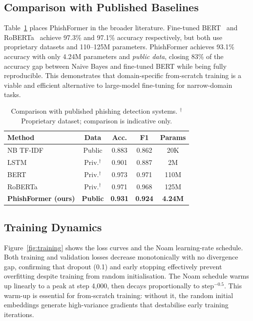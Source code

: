 \documentclass[sigconf, nonacm]{acmart}
\begin{document}
\subsection{Comparison with Published Baselines}

Table~\ref{tab:sota} places PhishFormer in the broader literature.
Fine-tuned BERT~\cite{goel2021} and RoBERTa~\cite{bountakas2023}
achieve 97.3\% and 97.1\% accuracy respectively, but both use
proprietary datasets and 110--125M parameters.
PhishFormer achieves 93.1\% accuracy with only 4.24M parameters and
\emph{public data}, closing 83\% of the accuracy gap between Naive
Bayes and fine-tuned BERT while being fully reproducible.
This demonstrates that domain-specific from-scratch training is a
viable and efficient alternative to large-model fine-tuning for
narrow-domain tasks.

\begin{table}[h]
\centering\small
\caption{Comparison with published phishing detection systems.
  $^\dagger$Proprietary dataset; comparison is indicative only.}
\label{tab:sota}
\begin{tabular}{@{}lcccc@{}}
\toprule
\textbf{Method} & \textbf{Data} & \textbf{Acc.} & \textbf{F1} & \textbf{Params} \\
\midrule
NB TF-IDF~\cite{metsis2006}      & Public        & 0.883 & 0.862 & 20K \\
LSTM~\cite{elalfy2017}           & Priv.$^\dagger$ & 0.901 & 0.887 & 2M \\
BERT~\cite{goel2021}             & Priv.$^\dagger$ & 0.973 & 0.971 & 110M \\
RoBERTa~\cite{bountakas2023}     & Priv.$^\dagger$ & 0.971 & 0.968 & 125M \\
\midrule
\textbf{PhishFormer (ours)}      & \textbf{Public}
  & \textbf{0.931} & \textbf{0.924} & \textbf{4.24M} \\
\bottomrule
\end{tabular}
\end{table}

\subsection{Training Dynamics}

Figure~\ref{fig:training} shows the loss curves and the Noam
learning-rate schedule.
Both training and validation losses decrease monotonically with no
divergence gap, confirming that dropout (0.1) and early stopping
effectively prevent overfitting despite training from random
initialisation.
The Noam schedule warms up linearly to a peak at step 4{,}000,
then decays proportionally to $\text{step}^{-0.5}$.
This warm-up is essential for from-scratch training: without it, the
random initial embeddings generate high-variance gradients that
destabilise early training iterations.
\end{document}
